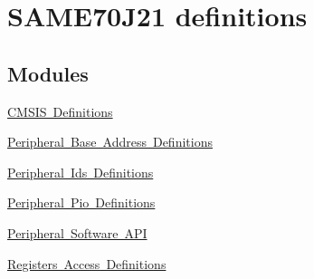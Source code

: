 \hypertarget{group__SAME70J21__definitions}{}\section{S\+A\+M\+E70\+J21 definitions}
\label{group__SAME70J21__definitions}
\subsection*{Modules}
\begin{DoxyCompactItemize}
\item 
\mbox{\hyperlink{group__SAME70J21__cmsis}{C\+M\+S\+I\+S Definitions}}
\item 
\mbox{\hyperlink{group__SAME70J21__base}{Peripheral Base Address Definitions}}
\item 
\mbox{\hyperlink{group__SAME70J21__id}{Peripheral Ids Definitions}}
\item 
\mbox{\hyperlink{group__SAME70J21__pio}{Peripheral Pio Definitions}}
\item 
\mbox{\hyperlink{group__SAME70J21__api}{Peripheral Software A\+PI}}
\item 
\mbox{\hyperlink{group__SAME70J21__reg}{Registers Access Definitions}}
\end{DoxyCompactItemize}

